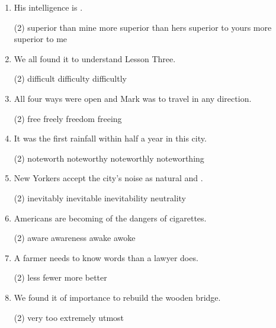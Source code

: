 \begin{enumerate}
\item His intelligence is \ttu.
  \begin{tasks}(2)
    \task superior than mine
    \task more superior than hers
    \task superior to yours
    \task more superior to me
  \end{tasks}

\item We all found it \ttu to understand Lesson Three.
  \begin{tasks}(2)
    \task difficult
    \task difficulty
    \task difficultly
  \end{tasks}

\item All four ways were open and Mark was \ttu to travel in any direction.
  \begin{tasks}(2)
    \task free
    \task freely
    \task freedom
    \task freeing
  \end{tasks}

\item It was the first \ttu rainfall within half a year in this city.
  \begin{tasks}(2)
    \task noteworth
    \task noteworthy
    \task noteworthly
    \task noteworthing
  \end{tasks}

\item New Yorkers accept the city's noise as natural and \ttu.
  \begin{tasks}(2)
    \task inevitably
    \task inevitable
    \task inevitability
    \task neutrality
  \end{tasks}

\item Americans are becoming \ttu of the dangers of cigarettes.
  \begin{tasks}(2)
    \task aware
    \task awareness
    \task awake
    \task awoke
  \end{tasks}

\item A farmer needs to know \ttu words than a lawyer does.
  \begin{tasks}(2)
    \task less
    \task fewer
    \task more
    \task better
  \end{tasks}

\item We found it of \ttu importance to rebuild the wooden bridge.
  \begin{tasks}(2)
    \task very
    \task too
    \task extremely
    \task utmost
  \end{tasks}


\end{enumerate}
